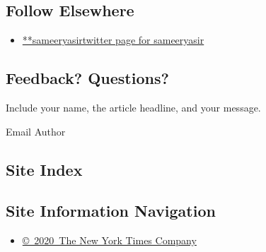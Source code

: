 \hypertarget{follow-elsewhere}{%
\subsection{Follow Elsewhere}\label{follow-elsewhere}}

\begin{itemize}
\tightlist
\item
  \href{https://twitter.com/sameeryasir}{**sameeryasirtwitter page for
  sameeryasir}
\end{itemize}

\hypertarget{feedback-questions}{%
\subsection{Feedback? Questions?}\label{feedback-questions}}

Include your name, the article headline, and your message.

Email Author

\hypertarget{site-index}{%
\subsection{Site Index}\label{site-index}}

\hypertarget{site-information-navigation}{%
\subsection{Site Information
Navigation}\label{site-information-navigation}}

\begin{itemize}
\tightlist
\item
  \href{https://help.nytimes3xbfgragh.onion/hc/en-us/articles/115014792127-Copyright-notice}{©~2020~The
  New York Times Company}
\end{itemize}

